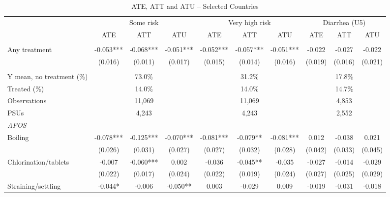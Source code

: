 \begin{table}[htbp]
\centering
\caption{ATE, ATT and ATU -- Selected Countries}
\label{tab:ate-att-atu-selected-countries-clustered-aggregated}
\scriptsize
\setlength{\tabcolsep}{4pt}
\renewcommand{\arraystretch}{0.92}
\begin{adjustbox}{max width=\linewidth}
\begin{tabular}{lccccccccc}
\hline\hline
 & \multicolumn{3}{c}{Some risk} & \multicolumn{3}{c}{Very high risk} & \multicolumn{3}{c}{Diarrhea (U5)} \\
\cmidrule(lr){2-4}\cmidrule(lr){5-7}\cmidrule(lr){8-10}
 & ATE & ATT & ATU & ATE & ATT & ATU & ATE & ATT & ATU \\
\addlinespace[3pt]
\multicolumn{10}{l}{\textit{IRM}} \\
Any treatment & -0.053*** & -0.068*** & -0.051*** & -0.052*** & -0.057*** & -0.051*** & -0.022 & -0.027 & -0.022 \\
 & (0.016) & (0.011) & (0.017) & (0.015) & (0.014) & (0.016) & (0.019) & (0.016) & (0.021) \\
\addlinespace[6pt]
\multicolumn{10}{l}{\textit{Descriptive statistics and sample}} \\
Y mean, no treatment (\%) & \multicolumn{3}{c}{73.0\%} & \multicolumn{3}{c}{31.2\%} & \multicolumn{3}{c}{17.8\%} \\
Treated (\%) & \multicolumn{3}{c}{14.0\%} & \multicolumn{3}{c}{14.0\%} & \multicolumn{3}{c}{14.7\%} \\
Observations & \multicolumn{3}{c}{11,069} & \multicolumn{3}{c}{11,069} & \multicolumn{3}{c}{4,853} \\
PSUs & \multicolumn{3}{c}{4,243} & \multicolumn{3}{c}{4,243} & \multicolumn{3}{c}{2,552} \\
\midrule
\multicolumn{10}{l}{\textit{APOS}} \\
Boiling & -0.078*** & -0.125*** & -0.070*** & -0.081*** & -0.079** & -0.081*** & 0.012 & -0.038 & 0.021 \\
 & (0.026) & (0.031) & (0.027) & (0.027) & (0.032) & (0.028) & (0.042) & (0.033) & (0.045) \\
Chlorination/tablets & -0.007 & -0.060*** & 0.002 & -0.036 & -0.045** & -0.035 & -0.027 & -0.014 & -0.029 \\
 & (0.022) & (0.017) & (0.024) & (0.022) & (0.019) & (0.024) & (0.027) & (0.025) & (0.029) \\
Straining/settling & -0.044* & -0.006 & -0.050** & 0.003 & -0.029 & 0.009 & -0.019 & -0.031 & -0.018 \\

\end{tabular}
\end{adjustbox}
\end{table}
